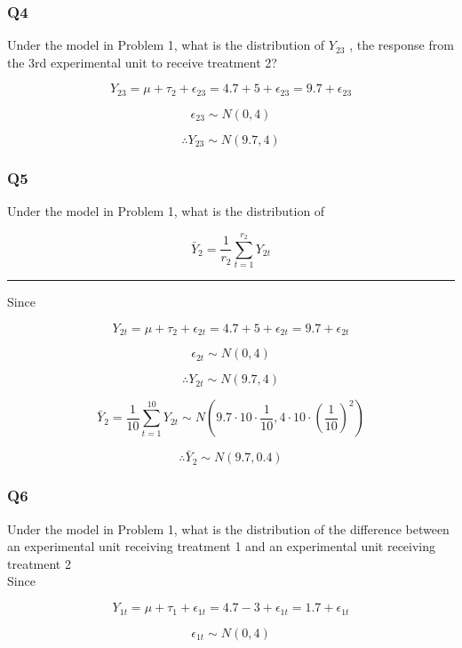 \documentclass[11pt]{article}
\begin{document}
    \subsubsection*{Q4}\label{q4}

    Under the model in Problem 1, what is the distribution of \(Y_{23}\) ,
the response from the 3rd experimental unit to receive treatment 2?

\[Y_{23} = \mu + \tau_2 + \epsilon_{23} = 4.7 + 5 + \epsilon_{23} = 9.7 + \epsilon_{23}\]

\[\epsilon_{23} \sim N(0, 4)\]

\[\therefore Y_{23} \sim N(9.7, 4)\]

    \subsubsection*{Q5}\label{q5}

    Under the model in Problem 1, what is the distribution of

\[\bar Y_2 = \frac{1}{r_2} \sum^{r_2}_{t=1} Y_{2t}\]

    \begin{center}\rule{1.1\linewidth}{\linethickness}\end{center}

Since

\[Y_{2t} = \mu + \tau_2 + \epsilon_{2t} = 4.7 + 5 + \epsilon_{2t} = 9.7 + \epsilon_{2t}\]

\[\epsilon_{2t} \sim N(0, 4)\]

\[\therefore Y_{2t} \sim N(9.7, 4)\]

\[\bar Y_2 = \frac{1}{10} \sum^{10}_{t=1} Y_{2t} \sim N(9.7\cdot 10 \cdot \frac{1}{10}, 4 \cdot 10 \cdot (\frac{1}{10})^2)\]

\[\therefore \bar Y_2 \sim N(9.7, 0.4)\]

    \subsubsection*{Q6}\label{q6}
    
    Under the model in Problem 1, what is the distribution of the difference between an experimental unit
    receiving treatment 1 and an experimental unit receiving treatment 2\\

    Since

\[Y_{1t} = \mu + \tau_1 + \epsilon_{1t} = 4.7 - 3 + \epsilon_{1t} = 1.7 + \epsilon_{1t}\]

\[\epsilon_{1t} \sim N(0, 4)\]
\end{document}
